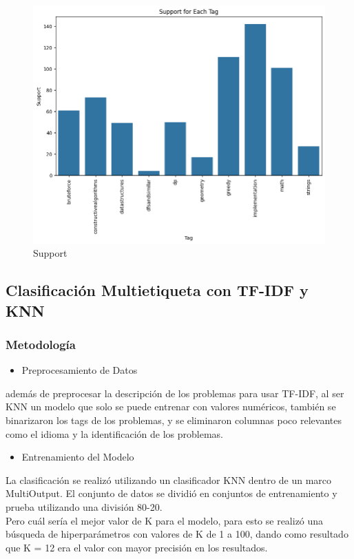 \documentclass{article}
\begin{document}
\begin{figure}[H]
    \centering
    \includegraphics[scale=0.49]{imgs/supportnb.png}
    \caption{Support}
    \label{fig:s}
\end{figure}

\subsection{Clasificación Multietiqueta con TF-IDF y KNN}
\subsubsection{Metodología}
\begin{itemize}
    \item Preprocesamiento de Datos
\end{itemize}
además de preprocesar la descripción de los problemas para usar TF-IDF, al ser KNN un modelo que solo se puede entrenar con valores numéricos, también se binarizaron los tags de los problemas, y se eliminaron columnas poco relevantes como el idioma y la identificación de los problemas.

\begin{itemize}
    \item Entrenamiento del Modelo
\end{itemize}
La clasificación se realizó utilizando un clasificador KNN dentro de un marco MultiOutput. El conjunto de datos se dividió en conjuntos de entrenamiento y prueba utilizando una división 80-20.\\ 
Pero cuál sería el mejor valor de K para el modelo, para esto se realizó una búsqueda de hiperparámetros con valores de K de 1 a 100, dando como resultado que K = 12 era el valor con mayor precisión en los resultados.
\end{document}
